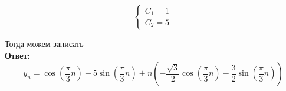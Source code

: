\documentclass[14pt,a4paper]{scrartcl}
\begin{document}
\begin{equation*}
	\left\{\begin{array}{l}
	C_{1}=1 \\
	C_{2}=5
	\end{array}\right.
\end{equation*}

Тогда можем записать\\
\textbf{Ответ:} 
\begin{equation*}
	y_n = \cos(\frac{\pi}{3}n) + 5\sin(\frac{\pi}{3}n) + n(-\frac{\sqrt{3}}{2}\cos(\frac{\pi}{3}n) - \frac{3}{2}\sin(\frac{\pi}{3}n))
\end{equation*}
\end{document}
